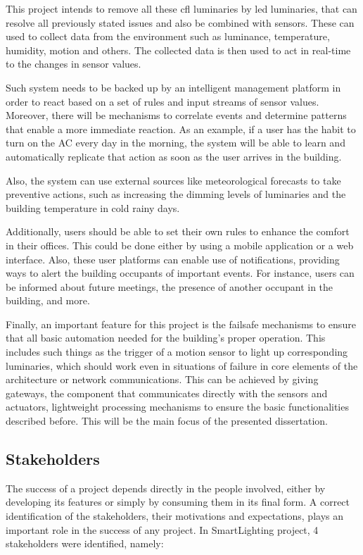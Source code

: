 This project intends to remove all these \ac{cfl} luminaries by \acf{led} luminaries, that can resolve all previously stated issues and also be combined with sensors. These can used to collect data from the environment such as luminance, temperature, humidity, motion and others. The collected data is then used to act in real-time to the changes in sensor values.

Such system needs to be backed up by an intelligent management platform in order to react based on a set of rules and input streams of sensor values. Moreover, there will be mechanisms to correlate events and determine patterns that enable a more immediate reaction. As an example, if a user has the habit to turn on the AC every day in the morning, the system will be able to learn and automatically replicate that action as soon as the user arrives in the building.

Also, the system can use external sources like meteorological forecasts to take preventive actions, such as increasing the dimming levels of luminaries and the building temperature in cold rainy days.


Additionally, users should be able to set their own rules to enhance the comfort in their offices. This could be done either by using a mobile application or a web interface. Also, these user platforms can enable use of notifications, providing ways to alert the building occupants of important events. For instance, users can be informed about future meetings, the presence of another occupant in the building, and more.


Finally, an important feature for this project is the failsafe mechanisms to ensure that all basic automation needed for the building’s proper operation. This includes such things as the trigger of a motion sensor to light up corresponding luminaries, which should work even in situations of failure in core elements of the architecture or network communications. This can be achieved by giving gateways, the component that communicates directly with the sensors and actuators, lightweight processing mechanisms to ensure the basic functionalities described before. This will be the main focus of the presented dissertation.



\subsection{Stakeholders}
\label{Architecture:Stakeholders}

The success of a project depends directly in the people involved, either by developing its features or simply by consuming them in its final form. A correct identification of the stakeholders, their motivations and expectations, plays an important role in the success of any project. In SmartLighting project, 4 stakeholders were identified, namely:

